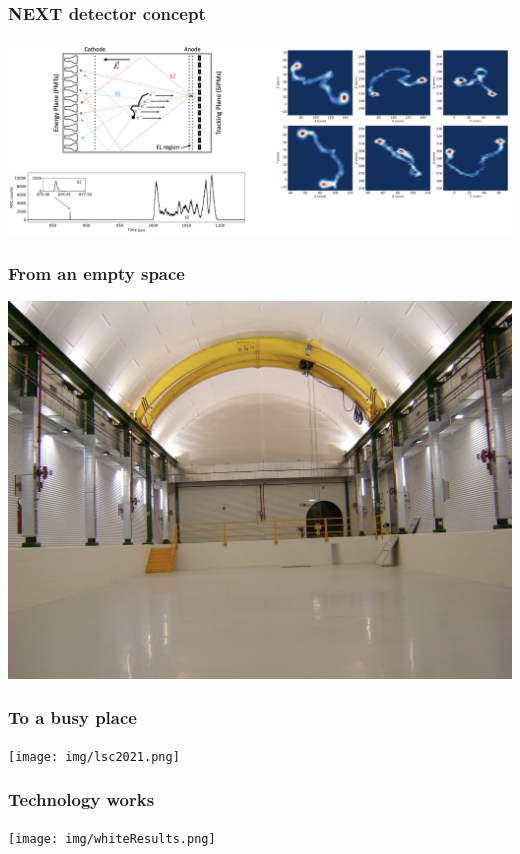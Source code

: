 \begin{frame}
\frametitle{NEXT detector concept}
\includegraphics[scale=0.30]{img/PrincipleNext2.png}
\end{frame}

\begin{frame}
\frametitle{From an empty space}
\includegraphics[scale=0.30]{img/emptyLSC.png}
\end{frame}

\begin{frame}
\frametitle{To a busy place}
\texttt{[image: img/lsc2021.png]}
\end{frame}

\begin{frame}
\frametitle{Technology works}
\texttt{[image: img/whiteResults.png]}
\end{frame}

